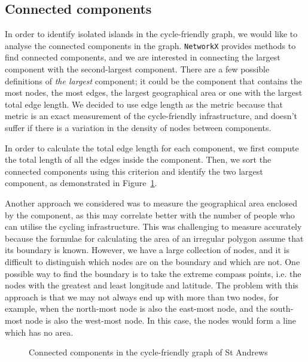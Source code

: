 \documentclass[12pt,a4paper]{report}
\begin{document}
\subsection{Connected components}
In order to identify isolated islands in the cycle-friendly graph, we would like to analyse the connected components in the graph. \texttt{NetworkX} provides methods to find connected components, and we are interested in connecting the largest component with the second-largest component. There are a few possible definitions of \textit{the largest} component; it could be the component that contains the most nodes, the most edges, the largest geographical area or one with the largest total edge length. We decided to use edge length as the metric because that metric is an exact measurement of the cycle-friendly infrastructure, and doesn't suffer if there is a variation in the density of nodes between components.

In order to calculate the total edge length for each component, we first compute the total length of all the edges inside the component. Then, we sort the connected components using this criterion and identify the two largest component, as demonstrated in Figure~\ref{fig:component}.

Another approach we considered was to measure the geographical area enclosed by the component, as this may correlate better with the number of people who can utilise the cycling infrastructure. This was challenging to measure accurately because the formulae for calculating the area of an irregular polygon assume that its boundary is known. However, we have a large collection of nodes, and it is difficult to distinguish which nodes are on the boundary and which are not. One possible way to find the boundary is to take the extreme compass points, i.e. the nodes with the greatest and least longitude and latitude. The problem with this approach is that we may not always end up with more than two nodes, for example, when the north-most node is also the east-most node, and the south-most node is also the west-most node. In this case, the nodes would form a line which has no area.

\begin{figure}[ht]
    \centering
    
    \caption{Connected components in the cycle-friendly graph of St Andrews}
    \label{fig:component}
\end{figure}
\end{document}
